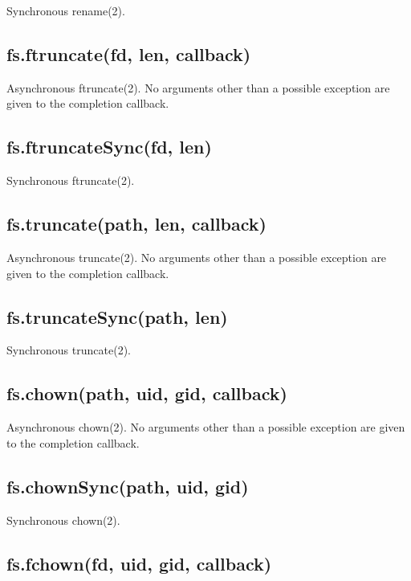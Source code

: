 Synchronous rename(2).

\subsection{fs.ftruncate(fd, len,
callback)}\label{fs.ftruncatefd-len-callback}

Asynchronous ftruncate(2). No arguments other than a possible exception
are given to the completion callback.

\subsection{fs.ftruncateSync(fd, len)}\label{fs.ftruncatesyncfd-len}

Synchronous ftruncate(2).

\subsection{fs.truncate(path, len,
callback)}\label{fs.truncatepath-len-callback}

Asynchronous truncate(2). No arguments other than a possible exception
are given to the completion callback.

\subsection{fs.truncateSync(path, len)}\label{fs.truncatesyncpath-len}

Synchronous truncate(2).

\subsection{fs.chown(path, uid, gid,
callback)}\label{fs.chownpath-uid-gid-callback}

Asynchronous chown(2). No arguments other than a possible exception are
given to the completion callback.

\subsection{fs.chownSync(path, uid,
gid)}\label{fs.chownsyncpath-uid-gid}

Synchronous chown(2).

\subsection{fs.fchown(fd, uid, gid,
callback)}\label{fs.fchownfd-uid-gid-callback}

